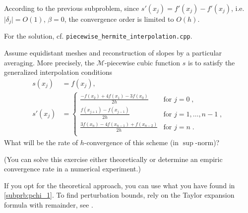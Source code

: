 \begin{problem}
\begin{subproblem}[3]
\cprotEnv \begin{solution}
   According to the previous subproblem, since $s'(x_j) = f'(x_j) - f'(x_j)$, i.e. $\lvert \delta_j \rvert = O(1)$, $\beta = 0$, the convergence order is limited to $O(h)$.
   
   For the \Cpp{} solution, cf. \verb|piecewise_hermite_interpolation.cpp|.
  \end{solution}
 \end{subproblem}

 \begin{subproblem}[1]
   Assume equidistant meshes and reconstruction of slopes by a particular
   averaging. More precisely,
   the $\mathcal{M}$-piecewise cubic function $s$ is to satisfy the generalized 
   interpolation conditions
  \begin{align*}
   s(x_j) & = f(x_j), \\
   s'(x_j) & = \begin{cases}
              \frac{-f(x_2) + 4f(x_1) - 3f(x_0)}{2h} &\text{for } j = 0\;, \\
              \frac{f(x_{j+1}) - f(x_{j-1})}{2h} &\text{for } j = 1,\dots,n-1\;, \\
              \frac{3f(x_n) - 4f(x_{n-1}) + f(x_{n-2})}{2h} &\text{for } j = n\;. \\
             \end{cases}
  \end{align*}
  What will be the rate of $h$-convergence of this scheme (in $\sup$-norm)?
  
  (You can solve this exercise either theoretically or  determine an empiric convergence rate in a numerical experiment.)
  
  \begin{hint}
    If you opt for the theoretical approach, you can
    use what you have found in \autoref{subprb:pchi_1}. To find perturbation
    bounds, rely on the Taylor expansion formula with remainder, see
    . 
  \end{hint}
  

\end{subproblem}
\end{problem}
